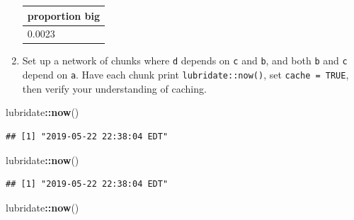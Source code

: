 \documentclass[]{book}
\newenvironment{Shaded}{\begin{snugshade}}{\end{snugshade}}
\newcommand{\DataTypeTok}[1]{\textcolor[rgb]{0.13,0.29,0.53}{#1}}
\newcommand{\FloatTok}[1]{\textcolor[rgb]{0.00,0.00,0.81}{#1}}
\newcommand{\KeywordTok}[1]{\textcolor[rgb]{0.13,0.29,0.53}{\textbf{#1}}}
\newcommand{\NormalTok}[1]{#1}
\newcommand{\OperatorTok}[1]{\textcolor[rgb]{0.81,0.36,0.00}{\textbf{#1}}}
\newcommand{\StringTok}[1]{\textcolor[rgb]{0.31,0.60,0.02}{#1}}
\theoremstyle{definition}
\theoremstyle{definition}
\theoremstyle{definition}
\theoremstyle{remark}
\begin{document}
\begin{enumerate}
\begin{Shaded}
\end{Shaded}

  \begin{tabular}{l}
  \hline
  proportion big\\
  \hline
  0.0023\\
  \hline
  \end{tabular}
\item
  Set up a network of chunks where \texttt{d} depends on \texttt{c} and
  \texttt{b}, and both \texttt{b} and \texttt{c} depend on \texttt{a}.
  Have each chunk print \texttt{lubridate::now()}, set
  \texttt{cache\ =\ TRUE}, then verify your understanding of caching.
\end{enumerate}

\begin{Shaded}
\begin{Highlighting}[]
\NormalTok{lubridate}\OperatorTok{::}\KeywordTok{now}\NormalTok{()}
\end{Highlighting}
\end{Shaded}

\begin{verbatim}
## [1] "2019-05-22 22:38:04 EDT"
\end{verbatim}

\begin{Shaded}
\begin{Highlighting}[]
\NormalTok{lubridate}\OperatorTok{::}\KeywordTok{now}\NormalTok{()}
\end{Highlighting}
\end{Shaded}

\begin{verbatim}
## [1] "2019-05-22 22:38:04 EDT"
\end{verbatim}

\begin{Shaded}
\begin{Highlighting}[]
\NormalTok{lubridate}\OperatorTok{::}\KeywordTok{now}\NormalTok{()}
\end{Highlighting}
\end{Shaded}
\end{document}
